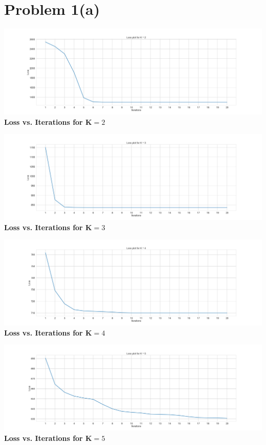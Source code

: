 \documentclass[openany,11pt]{homework}
\begin{document}
\maketitle

\section*{Problem 1(a)}

\begin{center}
	\centering
	\includegraphics[width = \textwidth]{1a_2.png}
	\textbf{Loss vs. Iterations for K$=2$}
\end{center}

\begin{center}
	\centering
	\includegraphics[width = \textwidth]{1a_3.png}
	\textbf{Loss vs. Iterations for K$=3$}
\end{center}

\begin{center}
	\centering
	\includegraphics[width = \textwidth]{1a_4.png}
	\textbf{Loss vs. Iterations for K$=4$}
\end{center}

\begin{center}
	\centering
	\includegraphics[width = \textwidth]{1a_5.png}
	\textbf{Loss vs. Iterations for K$=5$}
\end{center}
\end{document}
